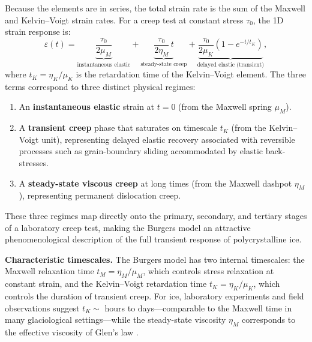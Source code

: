 \documentclass[11pt]{article}
\begin{document}
\noindent Because the elements are in series, the total strain rate is the sum of the Maxwell and Kelvin--Voigt strain rates.  For a creep test at constant stress $\tau_0$, the 1D strain response is:
\begin{equation}
  \boxed{\varepsilon(t) = \underbrace{\frac{\tau_0}{2\mu_M}}_{\text{instantaneous elastic}} + \underbrace{\frac{\tau_0}{2\eta_M}\,t}_{\text{steady-state creep}} + \underbrace{\frac{\tau_0}{2\mu_K}\left(1 - e^{-t/t_K}\right)}_{\text{delayed elastic (transient)}},}
  \label{eq:burgers_creep}
\end{equation}
where $t_K = \eta_K/\mu_K$ is the retardation time of the Kelvin--Voigt element.  The three terms correspond to three distinct physical regimes:
\begin{enumerate}
  \item An \textbf{instantaneous elastic} strain at $t = 0$ (from the Maxwell spring $\mu_M$).
  \item A \textbf{transient creep} phase that saturates on timescale $t_K$ (from the Kelvin--Voigt unit), representing delayed elastic recovery associated with reversible processes such as grain-boundary sliding accommodated by elastic back-stresses.
  \item A \textbf{steady-state viscous creep} at long times (from the Maxwell dashpot $\eta_M$), representing permanent dislocation creep.
\end{enumerate}

\noindent These three regimes map directly onto the primary, secondary, and tertiary stages of a laboratory creep test, making the Burgers model an attractive phenomenological description of the full transient response of polycrystalline ice.

\medskip
\noindent\textbf{Characteristic timescales.}  The Burgers model has two internal timescales: the Maxwell relaxation time $t_M = \eta_M/\mu_M$, which controls stress relaxation at constant strain, and the Kelvin--Voigt retardation time $t_K = \eta_K/\mu_K$, which controls the duration of transient creep.  For ice, laboratory experiments and field observations suggest $t_K \sim$ hours to days---comparable to the Maxwell time in many glaciological settings---while the steady-state viscosity $\eta_M$ corresponds to the effective viscosity of Glen's law \cite{CuffeyPaterson2010}.
\end{document}
